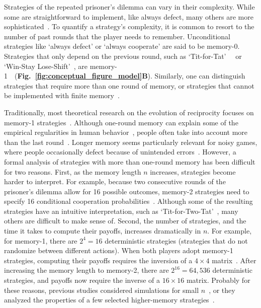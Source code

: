 \documentclass[11pt]{article}
\newcommand{\figref}[1]{{\textbf{Fig.~\ref{#1}}}}
\begin{document}
Strategies of the repeated prisoner's dilemma can vary in their complexity.
While some are straightforward to implement, like always defect, many others are more sophisticated~\cite{harper:PLOSONE:2017, knight:PLOSONE:2018}.
To quantify a strategy's complexity, it is common to resort to the number of past rounds that the player needs to remember. 
Unconditional strategies like `always defect' or `always cooperate' are said to be \mbox{memory-0}. 
Strategies that only depend on the previous round, such as `Tit-for-Tat'~~\cite{axelrod:AAAS:1981,Duersch:IJGT:2013} or `Win-Stay Lose-Shift'~\cite{Kraines:TaD:1989,nowak:Nature:1993}, are \mbox{memory-1}~~(\figref{fig:conceptual_figure_model}\textbf{B}). 
Similarly, one can distinguish strategies that require more than one round of memory, or strategies that cannot be implemented with finite memory~\cite{Garcia:FRAI:2018}. 

Traditionally, most theoretical research on the evolution of reciprocity focuses on memory-1 strategies~\citep{nowak:Nature:1993,imhof:PNAS:2005,grujic:jtb:2012,van-segbroeck:prl:2012,press:PNAS:2012,stewart:pnas:2013,Toupo:IJBC:2014,stewart:pnas:2014, akin:EGADS:2016,glynatsi:scientific:2020,chen:PNASnexus:2023}. 
Although one-round memory can explain some of the empirical regularities in human behavior~\cite{engle:ET:2006, dal:AER:2011, camera:GEB:2012, bruttel:TD:2012,Montero-Porras:SciRep:2022},  people often take into account more than the last round~\cite{romero:EER:2018}.
Longer memory seems particularly relevant for noisy games, where people occasionally defect because of unintended errors~\cite{fudenberg:AER:2012}. 
However, a formal analysis of strategies with more than one-round memory has been difficult for two reasons. 
First, as the memory length $n$ increases, strategies become harder to interpret. 
For example, because two consecutive rounds of the prisoner's dilemma allow for 16 possible outcomes, memory-2 strategies need to specify 16 conditional cooperation probabilities~\citep{hauert:PRSB:1997}. 
Although some of the resulting strategies have an intuitive interpretation, such as `Tit-for-Two-Tat'~\citep{axelrod:AAAS:1981}, many others are difficult to make sense of. 
Second, the number of strategies, and the time it takes to compute their payoffs, increases dramatically in $n$. 
For example, for memory-1, there are $2^4\!=\!16$ deterministic strategies (strategies that do not randomize between different actions). 
When both players adopt memory-1 strategies, computing their payoffs requires the inversion of a $4\!\times\!4$ matrix~\cite{sigmund2010}. 
After increasing the memory length to memory-2, there are $2^{16}\!=\!64,536$ deterministic strategies, and payoffs now require the inverse of a $16\!\times\!16$ matrix. 
Probably for these reasons, previous studies considered simulations for small $n$~\citep{hauert:PRSB:1997,stewart:scientific:2016,Murase:PLoSCompBio:2023a}, or they analyzed the properties of a few selected higher-memory strategies~\citep{hilbe:PNAS:2017,ueda:RSOP:2021,li:NatureCompSci:2022}. 
\end{document}
